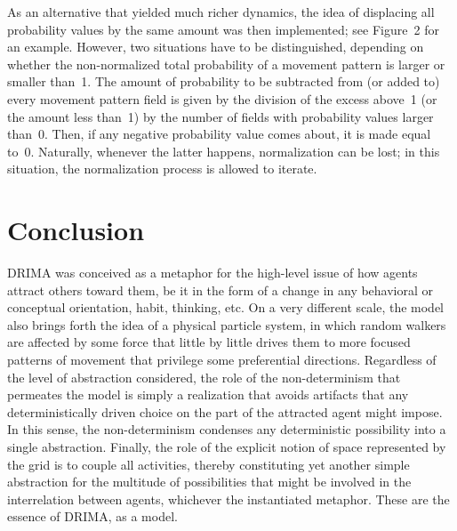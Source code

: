 \documentclass[11pt, a4paper]{article}
\begin{document}
As an alternative that yielded much richer dynamics, the idea of displacing all probability values by the same amount was then implemented; see Figure~2 for an example. However, two situations have to be distinguished, depending on whether the non-normalized total probability of a movement pattern is larger or smaller than~1. The amount of probability to be subtracted from (or added to) every movement pattern field is given by the division of the excess above~1 (or the amount less than~1) by the number of fields with probability values larger than~0. Then, if any negative probability value comes about, it is made equal to~0. Naturally, whenever the latter happens, normalization can be lost; in this situation, the normalization process is allowed to iterate.

\section{Conclusion}

DRIMA was conceived as a metaphor for the high-level issue of how agents attract others toward them, be it in the form of a change in any behavioral or conceptual orientation, habit, thinking, etc. On a very different scale, the model also brings forth the idea of a physical particle system, in which random walkers are affected by some force that little by little drives them to more focused patterns of movement that privilege some preferential directions. Regardless of the level of abstraction considered, the role of the non-determinism that permeates the model is simply a realization that avoids artifacts that any deterministically driven choice on the part of the attracted agent might impose. In this sense, the non-determinism condenses any deterministic possibility into a single abstraction. Finally, the role of the explicit notion of space represented by the grid is to couple all activities, thereby constituting yet another simple abstraction for the multitude of possibilities that might be involved in the interrelation between agents, whichever the instantiated metaphor. These are the essence of DRIMA, as a model.
\end{document}
